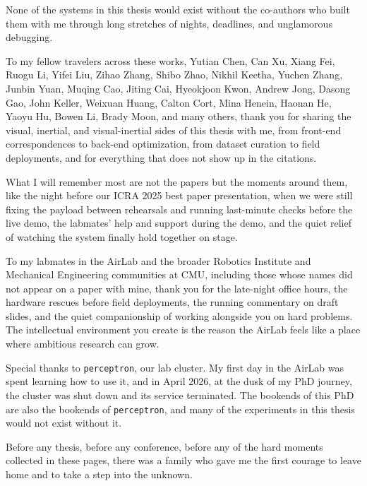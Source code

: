 None of the systems in this thesis would exist without the co-authors who built them with me through long stretches of nights, deadlines, and unglamorous debugging.

To my fellow travelers across these works, Yutian Chen, Can Xu, Xiang Fei, Ruogu Li, Yifei Liu, Zihao Zhang, Shibo Zhao, Nikhil Keetha, Yuchen Zhang, Junbin Yuan, Muqing Cao, Jiting Cai, Hyeokjoon Kwon, Andrew Jong, Dasong Gao, John Keller, Weixuan Huang, Calton Cort, Mina Henein, Haonan He, Yaoyu Hu, Bowen Li, Brady Moon, and many others, thank you for sharing the visual, inertial, and visual-inertial sides of this thesis with me, from front-end correspondences to back-end optimization, from dataset curation to field deployments, and for everything that does not show up in the citations.

What I will remember most are not the papers but the moments around them, like the night before our ICRA 2025 best paper presentation, when we were still fixing the payload between rehearsals and running last-minute checks before the live demo, the labmates' help and support during the demo, and the quiet relief of watching the system finally hold together on stage.

To my labmates in the AirLab and the broader Robotics Institute and Mechanical Engineering communities at CMU, including those whose names did not appear on a paper with mine, thank you for the late-night office hours, the hardware rescues before field deployments, the running commentary on draft slides, and the quiet companionship of working alongside you on hard problems.
The intellectual environment you create is the reason the AirLab feels like a place where ambitious research can grow.


Special thanks to \texttt{perceptron}, our lab cluster.
My first day in the AirLab was spent learning how to use it, and in April 2026, at the dusk of my PhD journey, the cluster was shut down and its service terminated.
The bookends of this PhD are also the bookends of \texttt{perceptron}, and many of the experiments in this thesis would not exist without it.

Before any thesis, before any conference, before any of the hard moments collected in these pages, there was a family who gave me the first courage to leave home and to take a step into the unknown.

